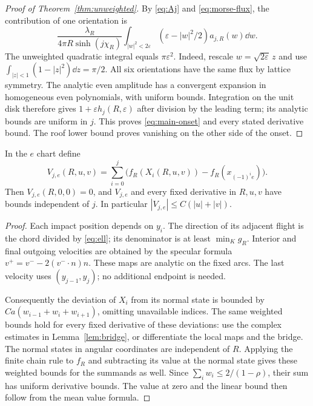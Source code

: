 \begin{proof}[Proof of Theorem~\ref{thm:unweighted}]
By \eqref{eq:Aj} and \eqref{eq:morse-flux}, the contribution of one
orientation is
\[
 \frac{\lambda_R}{4\pi R\sinh(j\chi_R)}
 \int_{|w|^2<2\varepsilon}
      (\varepsilon-|w|^2/2)a_{j,R}(w)\dd w.
\]
The unweighted quadratic integral equals $\pi\varepsilon^2$.
Indeed, rescale $w=\sqrt{2\varepsilon}\,z$ and use
$\int_{|z|<1}(1-|z|^2)\dd z=\pi/2$.
All six orientations have the same flux by lattice symmetry.
The analytic even amplitude has a convergent expansion in homogeneous
even polynomials, with uniform bounds. Integration on the unit disk
therefore gives $1+\varepsilon h_j(R,\varepsilon)$ after division by
the leading term; its analytic bounds are uniform in $j$.
This proves \eqref{eq:main-onset} and every stated derivative bound.
The roof lower bound proves vanishing on the other side of the onset.
\end{proof}

\begin{lemma}\label{lem:marks}
In the $e$ chart define
\[
 V_{j,e}(R,u,v)=\sum_{i=0}^j
       \bigl(f_R(X_i(R,u,v))-f_R(x_{(-1)^i e})\bigr).
\]
Then $V_{j,e}(R,0,0)=0$, and $V_{j,e}$ and every fixed derivative in
$R,u,v$ have bounds independent of $j$. In particular
$|V_{j,e}|\le C(|u|+|v|)$.
\end{lemma}
\begin{proof}
Each impact position depends on $y_i$. The direction of its adjacent
flight is the chord divided by \eqref{eq:ell}; its denominator is at
least $\min_Kg_R$. Interior and final outgoing velocities are obtained
by the specular formula $v^+=v^--2(v^-\cdot n)n$. These maps are
analytic on the fixed arcs. The last velocity uses $(y_{j-1},y_j)$;
no additional endpoint is needed.

Consequently the deviation of $X_i$ from its normal state is bounded
by $Ca(w_{i-1}+w_i+w_{i+1})$, omitting unavailable indices. The same
weighted bounds hold for every fixed derivative of these deviations:
use the complex estimates in Lemma~\ref{lem:bridge}, or differentiate
the local maps and the bridge. The normal states in angular coordinates
are independent of $R$. Applying the finite chain rule to $f_R$ and
subtracting its value at the normal state gives these weighted bounds
for the summands as well. Since $\sum_iw_i\le2/(1-\rho)$, their sum
has uniform derivative bounds. The value at zero and the linear bound
then follow from the mean value formula.
\end{proof}

